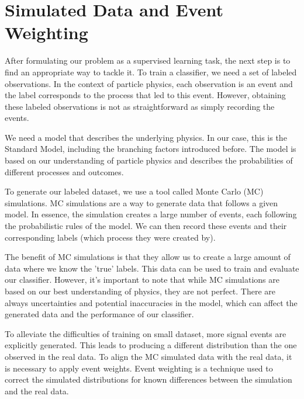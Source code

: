 
\section{Simulated Data and Event Weighting}

After formulating our problem as a supervised learning task, the next step is to find an appropriate way to tackle it.
To train a classifier, we need a set of labeled observations. In the context of particle physics, each observation is an
event and the label corresponds to the process that led to this event. However, obtaining these labeled observations is
not as straightforward as simply recording the events.

We need a model that describes the underlying physics. In our case, this is the Standard Model, including the branching
factors introduced before. The model is based on our understanding of particle physics and describes the probabilities
of different processes and outcomes.

To generate our labeled dataset, we use a tool called Monte Carlo (MC) simulations. MC simulations are a way to generate
data that follows a given model. In essence, the simulation creates a large number of events, each following the
probabilistic rules of the model. We can then record these events and their corresponding labels (which process they
were created by).

The benefit of MC simulations is that they allow us to create a large amount of data where we know the 'true' labels.
This data can be used to train and evaluate our classifier. However, it's important to note that while MC simulations
are based on our best understanding of physics, they are not perfect. There are always uncertainties and potential
inaccuracies in the model, which can affect the generated data and the performance of our classifier.

To alleviate the difficulties of training on small dataset, more signal events are explicitly generated. This leads to
producing a different distribution than the one observed in the real data. To align the MC simulated data with the real
data, it is necessary to apply event weights. Event weighting is a technique used to correct the simulated distributions
for known differences between the simulation and the real data.



